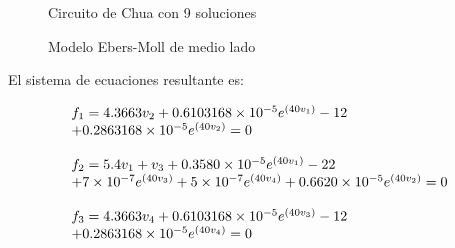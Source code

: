 \documentclass[conference,letterpaper,onecolumn]{IEEEtran}
\begin{document}
{\begin{table}[hbtp]
\caption{Valores de los componentes del circuito de Chua}
\label{chuatablet}
\end{table}






\begin{figure}[hbtp]
\centerline{
\epsfxsize=70mm
}
\caption{Circuito de Chua con 9 soluciones}
\label{chua}
\end{figure}


\begin{figure}[hbtp]
\centerline{
\epsfxsize=35mm
}
\caption{Modelo Ebers-Moll de medio lado}
\label{eber}
\end{figure}


El sistema de ecuaciones resultante es:

\begin{displaymath}
{\small
\begin{array}{l}
f_1=4.3663v_2+0.6103168 \times 10^{-5} e^{(40v_1)}-12\\+0.2863168\times 10^{-5}e^{(40v_2)}=0 \\ \\
f_2=5.4v_1+v_3+0.3580\times 10^{-5}e^{(40v_1)}-22\\+7\times 10^{-7}e^{(40v_3)}+  5\times 10^{-7}e^{(40v_4)}+0.6620\times 10^{-5}e^{(40v_2)}=0 \\ \\
f_3=4.3663v_4+0.6103168\times 10^{-5}e^{(40v_3)}-12\\+0.2863168\times 10^{-5}e^{(40v_4)}=0 \\
\end{array}
}
\end{displaymath}



}
\end{document}

